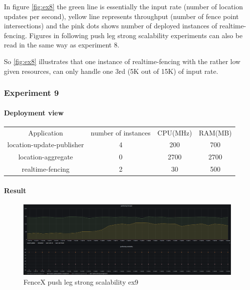 \documentclass[a4]{report}
\begin{document}
        In figure \ref{fig:ex8} the green line is essentially the input rate (number of location updates per second),
        yellow line represents throughput (number of fence point intersections) and the pink dots shows number of
        deployed instances of realtime-fencing.
        Figures in following push leg strong scalability experiments can also be read in the same way as experiment 8.

        So \ref{fig:ex8} illustrates that one instance of realtime-fencing with the rather low given resources, can only
        handle one 3rd (5K out of 15K) of input rate.

        \clearpage

        \subsubsection{Experiment 9}

        \paragraph{Deployment view}
        \begin{center}
            \begin{tabular}{ c c c c }
                Application               & number of instances & CPU(MHz) & RAM(MB) \\
                location-update-publisher & 4                   & 200      & 700     \\
                location-aggregate        & 0                   & 2700     & 2700    \\
                realtime-fencing          & 2                   & 30       & 500     \\
            \end{tabular}
        \end{center}

        \paragraph{Result}
        \begin{figure}[ht]
            \caption{FenceX push leg strong scalability ex9}
            \label{fig:ex9}
            \includegraphics[scale=0.4]{images/evaluation/ex9-benchmarking-ongoing-2per4sec.png}
        \end{figure}
\end{document}
